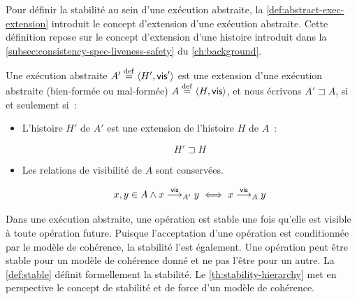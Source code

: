 Pour définir la stabilité au sein d'une exécution abstraite, la \autoref{def:abstract-exec-extension} introduit le concept d'extension d'une exécution abstraite.
Cette définition repose sur le concept d'extension d'une histoire introduit dans la \autoref{subsec:consistency-spec-liveness-safety} du \autoref{ch:background}.

\begin{definition}\label{def:abstract-exec-extension}
Une exécution abstraite $A' \defeq \tuple*{H',\trm{vis}'}$ est une extension d'une exécution abstraite (bien-formée ou mal-formée) $A \defeq \tuple*{H,\trm{vis}}$, et nous écrivons $A' \sqsupset A$, si et seulement si~:
\begin{itemize}
    \item L'histoire $H'$ de $A'$ est une extension de l'histoire $H$ de $A$~:

    \begin{equation*}
    H' \sqsupset H
    \end{equation*}

    \item Les relations de visibilité de $A$ sont conservées.

    \begin{equation*}
    x, y \in A \land x \vis_{A'} y \iff x \vis_{A} y
    \end{equation*}
\end{itemize}
\end{definition}


Dans une exécution abstraite, une opération est stable une fois qu'elle est visible à toute opération future.
Puisque l'acceptation d'une opération est conditionnée par le modèle de cohérence, la stabilité l'est également.
Une opération peut être stable pour un modèle de cohérence donné et ne pas l'être pour un autre.
La \autoref{def:stable} définit formellement la stabilité.
Le \autoref{th:stability-hierarchy} met en perspective le concept de stabilité et de force d'un modèle de cohérence.

